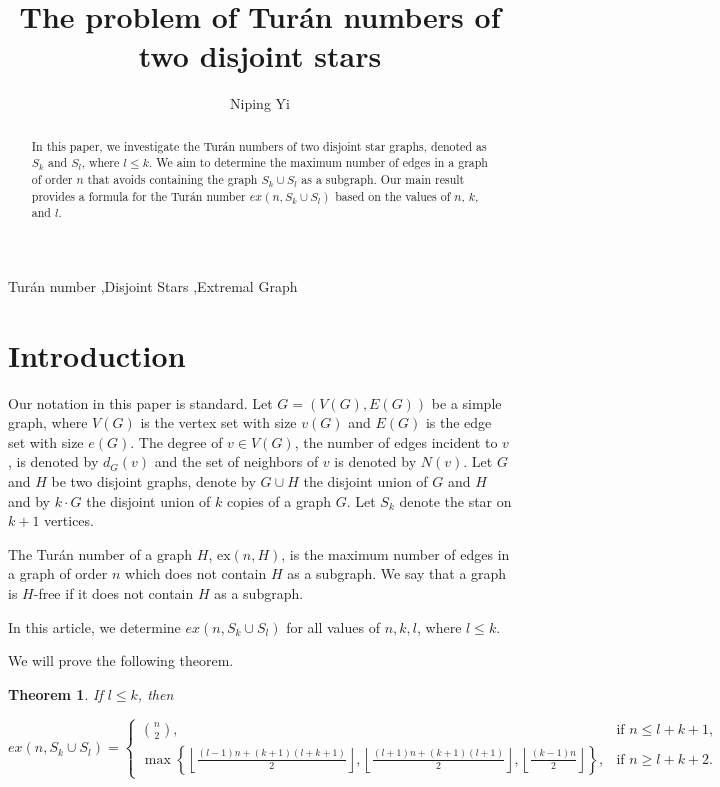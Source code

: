 \documentclass[12pt]{elsarticle}
\newtheorem{theorem}{Theorem}
\begin{document}
\begin{frontmatter}

\title{The problem of Turán numbers of two disjoint stars }

\author{Niping Yi}




\begin{abstract}
    In this paper, we investigate the Turán numbers of two disjoint star graphs, denoted as \( S_k \) and \( S_l \), where \( l \le k \). We aim to determine the maximum number of edges in a graph of order \( n \) that avoids containing the graph \( S_k \cup S_l \) as a subgraph. Our main result provides a formula for the Turán number \( ex(n, S_k \cup S_l) \) based on the values of \( n \), \( k \), and \( l \).  
    \end{abstract}

\begin{keyword}
Turán number \sep Disjoint Stars \sep Extremal Graph
\end{keyword}

\end{frontmatter}

\section{Introduction}
Our notation in this paper is standard. Let \( G = (V(G), E(G)) \) be a simple graph, where \( V(G) \) is the vertex set with size \( v(G) \) and \( E(G) \) is the edge set with size \( e(G) \). The degree of \( v \in V(G) \), the number of edges incident to \( v \), is denoted by \( d_G(v) \) and the set of neighbors of \( v \) is denoted by \( N(v) \).  Let \( G \) and \( H \) be two disjoint graphs, denote by \( G \cup H \) the disjoint union of \( G \) and \( H \) and by \( k \cdot G \) the disjoint union of \( k \) copies of a graph \( G \). Let \( S_k \) denote the star on \( k + 1 \) vertices. 

The Turán number of a graph \( H \), \( \text{ex}(n, H) \), is the maximum number of edges in a graph of order \( n \) which does not contain \( H \) as a subgraph. We say that a graph is \( H \)-free if it does not contain \( H \) as a subgraph.

In this article, we determine \( ex(n, S_k \cup S_l) \) for all values of \( n, k, l \), where \( l \le k \).


We will prove the following theorem.

\begin{theorem}\label{thm1}
    If $l \le k$, then
    \begin{footnotesize}
    \[
    ex(n, S_{k} \cup S_{l}) = 
    \begin{cases} 
    \binom{n}{2}, & \text{if } n \le l + k + 1, \\
    \max\left\{\left\lfloor \frac{(l-1)n+(k+1)(l+k+1)}{2} \right\rfloor, \left\lfloor \frac{(l+1)n+(k+1)(l+1)}{2} \right\rfloor, \left\lfloor \frac{(k-1)n}{2} \right\rfloor\right\}, & \text{if } n \ge l + k + 2.
    \end{cases}
    \]
\end{footnotesize}
    \end{theorem}
\end{document}
